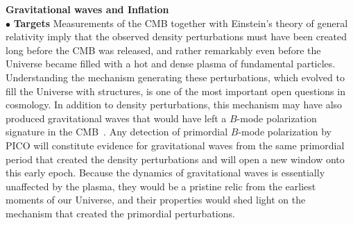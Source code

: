 \documentclass[PICOReport.tex]{subfiles}
\begin{document}
{\bf Gravitational waves and Inflation } \\ %
\noindent$\bullet$ {\bf Targets} \hspace{0.1in} Measurements of the \ac{CMB} together with Einstein's theory of general relativity imply that the observed density perturbations must have been created long before the \ac{CMB} was released, and rather remarkably even before the Universe became filled with a hot and dense plasma of fundamental particles. Understanding the mechanism generating these perturbations, which evolved to fill the Universe with structures, is one of the most important open questions in cosmology. In addition to density perturbations, this mechanism may have also produced gravitational waves that would have left a $B$-mode polarization signature in the CMB~\cite{Seljak:1996gy,Kamionkowski:1996zd}. 
Any detection of primordial $B$-mode polarization by PICO will constitute evidence for gravitational waves from the same primordial period that created the density perturbations and will open a new window onto this early epoch. Because the dynamics of gravitational waves is essentially unaffected by the plasma, they would be a pristine relic from the earliest moments of our Universe, and their properties would shed light on the mechanism that created the primordial perturbations. 



\end{document}
